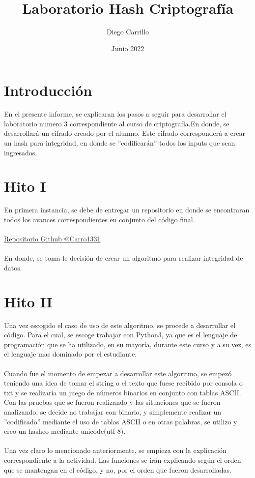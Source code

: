 \documentclass{article}
\title{Laboratorio Hash Criptografía}
\author{Diego Carrillo }
\date{Junio 2022}
\begin{document}
\maketitle

\newpage
\tableofcontents
\newpage
\section{Introducción}
En el presente informe, se explicaran los pasos a seguir para desarrollar el laboratorio numero 3 correspondiente al curso de criptografía.En donde, se desarrollará un cifrado creado por el alumno.
\newline \newline
Este cifrado corresponderá a crear un hash para integridad, en donde se ''codificarán'' todos los inputs que sean ingresados.
\section{Hito I}
En primera instancia, se debe de entregar un repositorio en donde se encontraran todos los avances correspondientes en conjunto del código final.
\\\\
\href{https://github.com/Carro1331/Hash}{Repositorio Github @Carro1331}
\\\\
En donde, se toma le decisión de crear un algoritmo para realizar integridad de datos.

\section{Hito II}
Una vez escogido el caso de uso de este algoritmo, se procede a desarrollar el código. Para el cual, se escoge trabajar con Python3, ya que es el lenguaje de programación que se ha utilizado, en su mayoría, durante este curso y a su vez, es el lenguaje mas dominado por el estudiante.
\\\\
Cuando fue el momento de empezar a desarrollar este algoritmo, se empezó teniendo una idea de tomar el string o el texto que fuese recibido por consola o txt y se realizaría un juego de números binarios en conjunto con tablas ASCII. Con las pruebas que se fueron realizando y las situaciones que se fueron analizando, se decide no trabajar con binario, y simplemente realizar un ''codificado'' mediante el uso de tablas ASCII o en otras palabras, se utilizo y creo un hasheo mediante unicode(utf-8). 
\\\\
Una vez claro lo mencionado anteriormente, se empieza con la explicación correspondiente a la actividad. Las funciones se irán explicando según el orden que se mantengan en el código, y no, por el orden que fueron desarrolladas. 
\newpage
\end{document}

